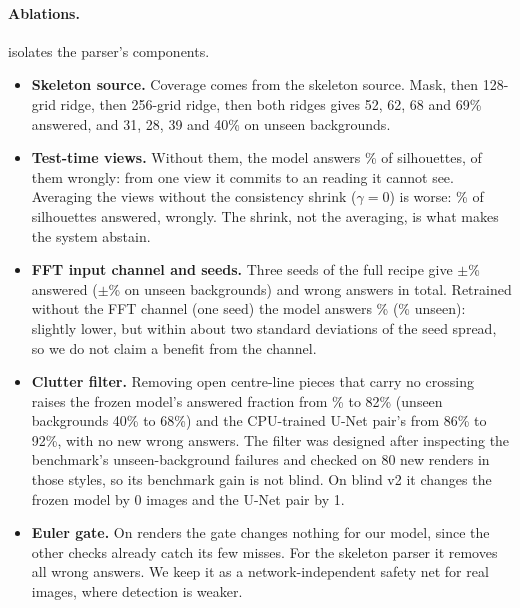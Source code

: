 \begin{table}[t]
\centering\footnotesize
\setlength{\tabcolsep}{3pt}
\caption{\textbf{Ablations} on \bench{} (v3 trunk unless noted). Silh.\ ans.\ =
fraction of silhouettes answered, which must be 0 because \ou{} is not visible.}
\label{tab:ablation}
\end{table}

\paragraph{Ablations.}  isolates the parser's components.
\begin{itemize}
\item \textbf{Skeleton source.} Coverage comes from the skeleton source. Mask, then
  128-grid ridge, then 256-grid ridge, then both ridges gives 52, 62, 68 and 69\%
  answered, and 31, 28, 39 and 40\% on unseen backgrounds.
\item \textbf{Test-time views.} Without them, the model answers \NoTTASilCov\% of
  silhouettes, \NoTTASilWrong{} of them wrongly: from one view it commits to an
  \ou{} reading it cannot see. Averaging the views without the consistency shrink
  ($\gamma=0$) is worse: \GzeroSilCov\% of silhouettes answered, \GzeroSilWrong{} wrongly.
  The shrink, not the averaging, is what makes the system abstain.
\item \textbf{FFT input channel and seeds.} Three seeds of the full recipe give
  \SeedCov$\pm$\SeedCovSd\% answered (\SeedUnseen$\pm$\SeedUnseenSd\% on unseen backgrounds) and
  \SeedWrong{} wrong answers in total. Retrained without the FFT channel (one seed) the model
  answers \NoFFTCov\% (\NoFFTUnseen\% unseen): slightly lower, but within about two standard
  deviations of the seed spread, so we do not claim a benefit from the channel.
\item \textbf{Clutter filter.} Removing open centre-line pieces that carry no crossing raises the frozen
  model's answered fraction from \VthreeCov\% to 82\% (unseen backgrounds 40\% to 68\%) and the CPU-trained
  U-Net pair's from 86\% to 92\%, with no new wrong answers. The filter was designed after inspecting the
  benchmark's unseen-background failures and checked on 80 new renders in those styles, so its benchmark
  gain is not blind. On blind v2 it changes the frozen model by 0 images and the U-Net pair by 1.
\item \textbf{Euler gate.} On renders the gate changes nothing for our model, since
  the other checks already catch its few misses. For the skeleton parser it removes
  all \BaseWrongNoGate{} wrong answers. We keep it as a network-independent safety
  net for real images, where detection is weaker.
\end{itemize}

